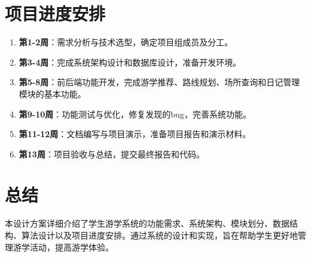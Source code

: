 \documentclass{ctexart}
\begin{document}
\section{项目进度安排}
\begin{enumerate}
    \item \textbf{第1-2周}：需求分析与技术选型，确定项目组成员及分工。
    \item \textbf{第3-4周}：完成系统架构设计和数据库设计，准备开发环境。
    \item \textbf{第5-8周}：前后端功能开发，完成游学推荐、路线规划、场所查询和日记管理模块的基本功能。
    \item \textbf{第9-10周}：功能测试与优化，修复发现的bug，完善系统功能。
    \item \textbf{第11-12周}：文档编写与项目演示，准备项目报告和演示材料。
    \item \textbf{第13周}：项目验收与总结，提交最终报告和代码。
\end{enumerate}

\section{总结}
本设计方案详细介绍了学生游学系统的功能需求、系统架构、模块划分、数据结构、算法设计以及项目进度安排。通过系统的设计和实现，旨在帮助学生更好地管理游学活动，提高游学体验。
\end{document}
